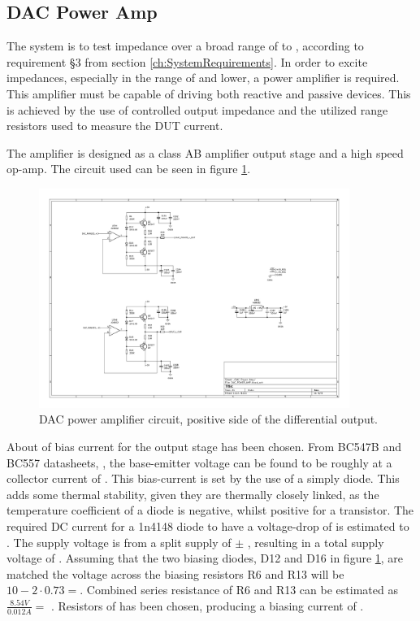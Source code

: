 \subsection{DAC Power Amp} \label{subsec:DAC_Filter}
The system is to test impedance over a broad range of  to , according to requirement §3 from section \ref{ch:SystemRequirements}. In order to excite impedances, especially in the range of  and lower, a power amplifier is required. This amplifier must be capable of driving both reactive and passive devices. This is achieved by the use of controlled output impedance and the utilized range resistors used to measure the DUT current. 

The amplifier is designed as a class AB amplifier output stage and a high speed op-amp. The circuit used can be seen in figure \ref{fig_7_1_1_5_DAC_POWER_AMP}.

\begin{figure}[H]
    \centering
    \includegraphics[clip, trim=150 320 440 40, width=0.9\textwidth]{Sections/7_SystemDesign/Figures/7_1_1_5_DAC Power Amp.pdf}
    \caption{DAC power amplifier circuit, positive side of the differential output.}
    \label{fig_7_1_1_5_DAC_POWER_AMP}
\end{figure}

About  of bias current for the output stage has been chosen. From BC547B and BC557 datasheets, \cite{BC547_datasheet} \cite{BC557_datasheet}, the base-emitter voltage can be found to be roughly  at a collector current of . This bias-current is set by the use of a simply diode. This adds some thermal stability, given they are thermally closely linked, as the temperature coefficient of a diode is negative, whilst positive for a transistor. The required DC current for a 1n4148 diode to have a voltage-drop of  is estimated to . The supply voltage is from a split supply of $\pm$ , resulting in a total supply voltage of . Assuming that the two biasing diodes, D12 and D16 in figure \ref{fig_7_1_1_5_DAC_POWER_AMP}, are matched the voltage across the biasing resistors R6 and R13 will be $10-2\cdot0.73 = $. Combined series resistance of R6 and R13 can be estimated as $\frac{8.54 V}{0.012 A} = $ . Resistors of  has been chosen, producing a biasing current of .

